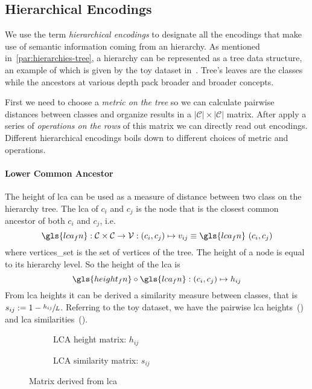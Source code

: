 \subsection{Hierarchical Encodings}
\label{subsec:hierarchical-encodings}
We use the term \emph{hierarchical encodings} to designate all the encodings
that make use of semantic information coming from an hierarchy. As mentioned
in~\cref{par:hierarchies-tree}, a hierarchy can be represented as a tree data
structure, an example of which is given by the toy dataset
in~. Tree's leaves are the classes while the ancestors
at various depth pack broader and broader concepts.

First we need to choose a \emph{metric on the tree} so we can calculate
pairwise distances between classes and organize results in a $|\mathcal{C}|
\times |\mathcal{C}|$ matrix. After apply a series of \emph{operations on the
rows} of this matrix we can directly read out encodings. Different hierarchical
encodings boils down to different choices of metric and operations.

\paragraph{Lower Common Ancestor}
The height of \acrfull{lca} can be used as a measure of distance between two
class on the hierarchy tree. The \acrshort{lca} of $c_i$ and $c_j$ is the node
that is the closest common ancestor of both $c_i$ and $c_j$, i.e.
\begin{equation}
  \gls{lca_fn} : \mathcal{C} \times \mathcal{C} \to \mathcal{V}:
  \left(c_i, c_j\right) \mapsto v_{ij} \equiv
  \gls{lca_fn} \, \left(c_i, c_j\right)
  \label{eq:lca}
\end{equation}
where \gls{vertices_set} is the set of vertices of the tree. The height of a
node is equal to its hierarchy level. So the height of the \acrshort{lca} is
\begin{equation}
  \gls{height_fn} \circ \gls{lca_fn} : \left(c_i, c_j\right) \mapsto h_{ij}
  \label{eq:lca-height}
\end{equation}
From \acrshort{lca} heights it can be derived a similarity measure between
classes, that is $s_{ij} := 1 - \sfrac{h_{ij}}{L}$. Referring to the toy
dataset, we have the pairwise lca heights~() and
lca similarities~().
\begin{figure}[htbp]
  \begin{subfigure}{0.45\textwidth}
    \caption{LCA height matrix: $h_{ij}$}
    \label{fig:lca-height-matrix}
  \end{subfigure}
  \begin{subfigure}{0.45\textwidth}
    \caption{LCA similarity matrix: $s_{ij}$}
    \label{fig:lca-similarity-matrix}
  \end{subfigure}
  \caption{Matrix derived from \acrlong{lca}}
\end{figure}

